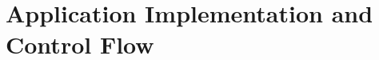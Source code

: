 \documentclass[conference,final]{IEEEtran}
\newcommand{\yaakoub}[0]{}
\newcommand{\jhanote}[1]{ {\textcolor{red} { ***Jha: #1 }}}
\begin{document}




\section{Application Implementation and Control Flow} 
\end{document}
